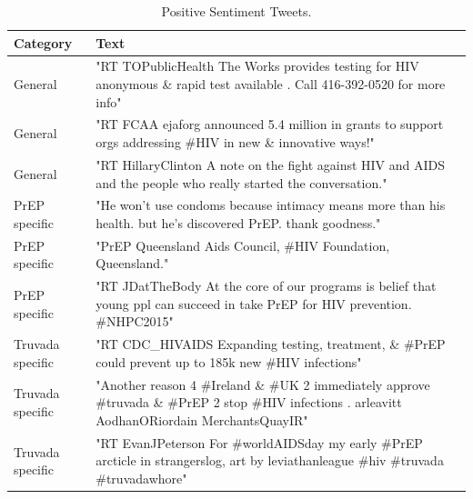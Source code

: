 \documentclass{sig-alternate-05-2015}
\begin{document}
\begin{table}
\centering
\caption{Positive Sentiment Tweets.}
\begin{tabular}{|p{2.5cm}|p{12cm}|} \hline
Category & Text\\ \hline
General & "RT TOPublicHealth The Works provides testing for HIV anonymous \& rapid test available . Call 416-392-0520 for more info"\\ \hline
General & "RT FCAA ejaforg announced 5.4 million in grants to support orgs addressing \#HIV in new \& innovative ways!"\\ \hline
General & "RT HillaryClinton A note on the fight against HIV and AIDS and the people who really started the conversation."\\ \hline

PrEP specific & "He won't use condoms because intimacy means more than his health. but he's discovered PrEP. thank goodness."\\ \hline
PrEP specific & "PrEP Queensland Aids Council, \#HIV Foundation, Queensland."\\ \hline
PrEP specific & "RT JDatTheBody At the core of our programs is belief that young ppl can succeed in take PrEP for HIV prevention. \#NHPC2015"\\ \hline

Truvada specific & "RT CDC\_HIVAIDS Expanding testing, treatment, \& \#PrEP could prevent up to 185k new \#HIV infections"\\ \hline
Truvada specific & "Another reason 4 \#Ireland \& \#UK 2 immediately approve \#truvada \& \#PrEP 2 stop \#HIV infections . arleavitt AodhanORiordain MerchantsQuayIR"\\ \hline
Truvada specific & "RT EvanJPeterson For \#worldAIDSday my early \#PrEP arcticle in strangerslog, art by leviathanleague \#hiv \#truvada \#truvadawhore"\\ \hline

\hline\end{tabular}
\end{table}
\end{document}
